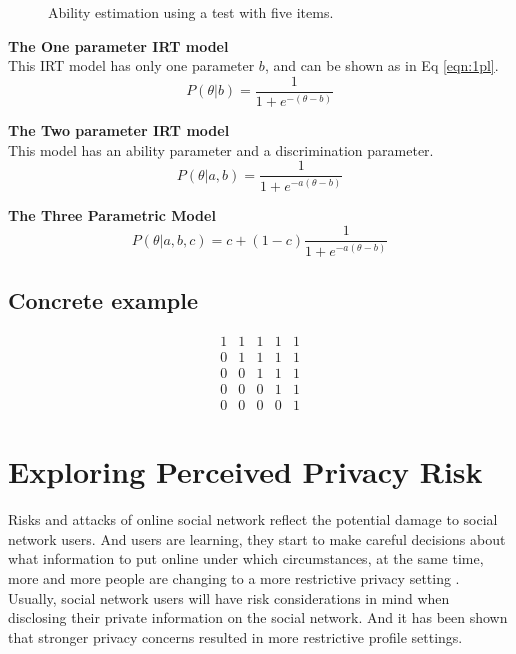 \documentclass[a4paper]{article}
\begin{document}
\begin{enumerate}
\begin{figure}
    \caption{Ability estimation using a test with five items.}
    \label{fig:predict-ability}
  \end{figure}
\end{enumerate}

\textbf{The One parameter IRT model} \\
This IRT model has only one parameter $b$, and can be shown as in Eq
\ref{eqn:1pl}. 
\begin{equation}
    P(\theta|b) = \frac{1}{1+e^{-(\theta - b)}}
    \label{eqn:1pl}
\end{equation}

\textbf{The Two parameter IRT model}\\
This model has an ability parameter and a discrimination parameter. 
\begin{equation}
    P(\theta|a,b) = \frac{1}{1+e^{-a(\theta - b)}}
    \label{eqn:2pl}
\end{equation}

\textbf{The Three Parametric Model} \\ 
\begin{equation}
    P(\theta|a,b,c) = c + (1-c)\frac{1}{1+e^{-a(\theta - b)}}
    \label{eqn:3pl}
\end{equation}

\subsection{Concrete example}
\[\begin{array}{ccccc}
  1 & 1 & 1 & 1 & 1 \\
  0 & 1 & 1 & 1 & 1 \\
  0 & 0 & 1 & 1 & 1 \\
  0 & 0 & 0 & 1 & 1 \\
  0 & 0 & 0 & 0 & 1 
\end{array}
\]
\section{Exploring Perceived Privacy Risk}
Risks and attacks of online social network reflect the potential
damage to social network users. And users are learning, they start to
make careful decisions about what information to put online under
which circumstances, at the same time, more and more people are
changing to a more restrictive privacy setting \cite{socialnet:setting}.
Usually, social network users will have risk considerations in
mind when disclosing their private information
on the social network. And it has been shown
\cite{privacy:paradox:revisit} that stronger privacy
concerns resulted in more restrictive profile settings.
\end{document}
